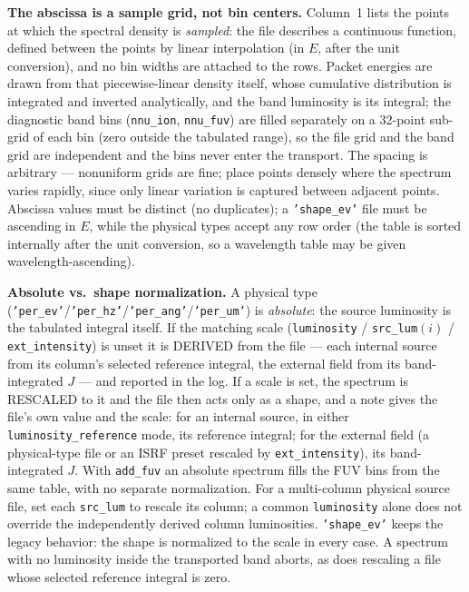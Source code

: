 \documentclass[english,a4paper]{my_memo}
\newcommand{\code}[1]{\texttt{#1}}
\begin{document}
\medskip\noindent\textbf{The abscissa is a sample grid, not bin centers.}
Column~1 lists the points at which the spectral density is \emph{sampled}:
the file describes a continuous function, defined between the points by
linear interpolation (in $E$, after the unit conversion), and no bin widths
are attached to the rows.  Packet energies are drawn from that
piecewise-linear density itself, whose cumulative distribution is integrated
and inverted analytically, and the band luminosity is its integral; the
diagnostic band bins (\code{nnu\_ion}, \code{nnu\_fuv}) are filled
separately on a 32-point sub-grid of each bin (zero outside the tabulated
range), so the file grid and the band grid are independent and the bins
never enter the transport.  The spacing
is arbitrary --- nonuniform grids are fine; place points densely where the
spectrum varies rapidly, since only linear variation is captured between
adjacent points.  Abscissa values must be distinct (no duplicates); a
\code{'shape\_ev'} file must be ascending in $E$, while the physical types
accept any row order (the table is sorted internally after the unit
conversion, so a wavelength table may be given wavelength-ascending).

\medskip\noindent\textbf{Absolute vs.\ shape normalization.}  A physical
type (\code{'per\_ev'}/\code{'per\_hz'}/\code{'per\_ang'}/\code{'per\_um'}) is
\emph{absolute}: the source luminosity is the tabulated integral
itself.  If the matching scale (\code{luminosity} / \code{src\_lum}$(i)$
/ \code{ext\_intensity}) is unset it is DERIVED from the file --- each
internal source from its column's selected reference integral, the external field
from its band-integrated $J$ --- and reported in the log.  If a scale is
set, the spectrum is RESCALED to it and the file then acts only as a
shape, and a note gives the file's own value and the scale: for an
internal source, in either \code{luminosity\_reference} mode, its
reference integral; for the external field (a physical-type file or an
ISRF preset rescaled by \code{ext\_intensity}), its band-integrated $J$.  With \code{add\_fuv} an absolute spectrum fills the
FUV bins from the same table, with no separate normalization.
For a multi-column physical source file, set each \code{src\_lum} to
rescale its column; a common \code{luminosity} alone does not override
the independently derived column luminosities.
\code{'shape\_ev'} keeps the legacy behavior: the shape is normalized to the
scale in every case.  A spectrum with no luminosity inside the transported
band aborts, as does rescaling a file whose selected reference integral is zero.
\end{document}
